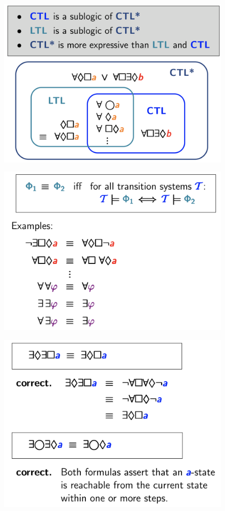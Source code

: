 \documentclass[a4paper, notitlepage, 9pt]{extreport}
\begin{document}
\begin{multicols}{3}
	\begin{figure}[H]
		\centering
		\includegraphics[scale=0.15]{*3}
	\end{figure}
	\columnbreak
	\begin{figure}[H]
		\centering
		\includegraphics[scale=0.15]{*1}
	\end{figure}
	\columnbreak
	\begin{figure}[H]
		\centering
		\includegraphics[scale=0.15]{*2}
	\end{figure}
\end{multicols}
\end{document}
